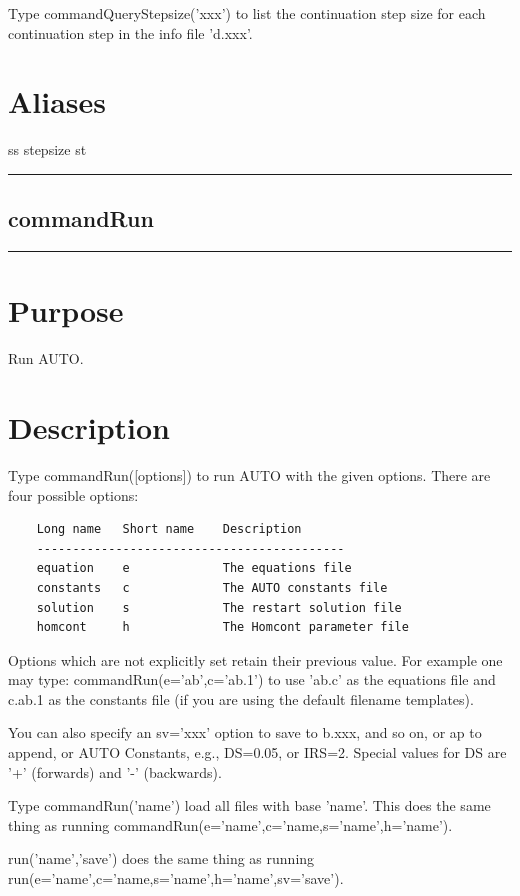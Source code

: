 \documentclass[12pt]{report}
\begin{document}
\begin{minipage}{6in}
    Type commandQueryStepsize('xxx') to list the continuation step size for each
    continuation step in the info file 'd.xxx'.
    \section*{Aliases}
ss stepsize st \medskip\hrule\end{minipage}\subsection{commandRun} \label{sec:clui_ref_commandRun}\begin{minipage}{6in}\hrule\medskip\section*{Purpose}
Run AUTO.\section*{Description}

    Type commandRun([options]) to run AUTO with the given options.
    There are four possible options:
    \begin{verbatim}
    Long name   Short name    Description
    -------------------------------------------
    equation    e             The equations file
    constants   c             The AUTO constants file
    solution    s             The restart solution file
    homcont     h             The Homcont parameter file
    \end{verbatim}
    Options which are not explicitly set retain their previous value.
    For example one may type: commandRun(e='ab',c='ab.1') to use 'ab.c' as
    the equations file and c.ab.1 as the constants file (if you are
    using the default filename templates).

    You can also specify an sv='xxx' option to save to b.xxx, and so on,
    or ap to append, or AUTO Constants, e.g., DS=0.05, or IRS=2.
    Special values for DS are '+' (forwards) and '-' (backwards).

    Type commandRun('name') load all files with base 'name'.
    This does the same thing as running
    commandRun(e='name',c='name,s='name',h='name').

    run('name','save') does the same thing as running
    run(e='name',c='name,s='name',h='name',sv='save').

\end{minipage}
\end{document}
